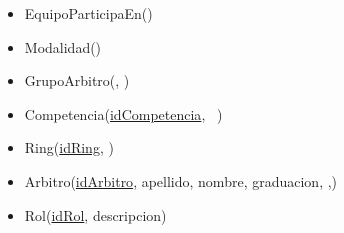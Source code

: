 \begin{itemize}
\item EquipoParticipaEn()

\item Modalidad()

\item{GrupoArbitro(, )\\
}

\item Competencia(\underline{idCompetencia},  )

\item Ring(\underline{idRing}, )

\item Arbitro(\underline{idArbitro}, apellido, nombre, graduacion,  ,)\\

\item Rol(\underline{idRol}, descripcion)




\end{itemize}

